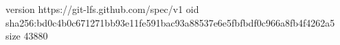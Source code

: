 version https://git-lfs.github.com/spec/v1
oid sha256:bd0c4b0c671271bb93e11fe591bac93a88537e6e5fbfbdf0c966a8fb4f4262a5
size 43880
